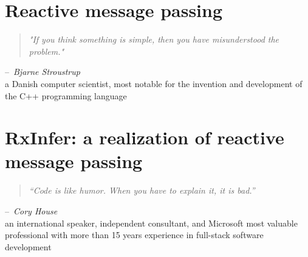 \documentclass[russian,dutch,english,b5paper,10pt]{book}
\begin{document}






\null\thispagestyle{empty}\stopthumb 
 
\chapter{Reactive message passing} 
\label{chapter-03}
\begin{quote}
  \emph{"If you think something is simple, then you have misunderstood the problem."}
\end{quote}
\null\hfill --~\textit{Bjarne Stroustrup}\\
\null\hfill\small{a Danish computer scientist, most notable for the invention and development of the C++ programming language}







\null\thispagestyle{empty}\stopthumb 
 
\chapter{RxInfer: a realization of reactive message
  passing} \label{chapter-04}
\begin{quote}
  \emph{``Code is like humor. When you have to explain it, it is bad.''}
\end{quote}
\null\hfill  --~\textit{Cory House}\\
\null\hfill\small{an international speaker, independent consultant, and Microsoft most valuable professional with more than 15 years experience in full-stack software development}







\end{document}
